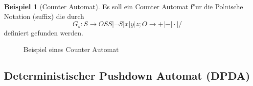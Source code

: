 \documentclass[german, 10pt, a4paper, twocolumn]{scrartcl}
\theoremstyle{definition}
\theoremstyle{example}
\newtheorem{example}{Beispiel}[subsection]
\begin{document}
\begin{example}[Counter Automat]
	Es soll ein Counter Automat f"ur die Polnische Notation (suffix) die durch
	\begin{displaymath}
		G_s : S \rightarrow OSS | \lnot S | x | y | z; O \rightarrow + | - | \cdotp | /
	\end{displaymath}
	definiert gefunden werden.

	\begin{figure}[htb]
		\begin{center}
			\MediumPicture
		\end{center}
		\caption{Beispiel eines Counter Automat}
	\end{figure}

\end{example}

\subsection{Deterministischer Pushdown Automat (DPDA)}
\end{document}
